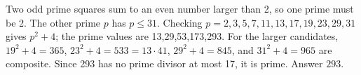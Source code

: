 Two odd prime squares sum to an even number larger than 2, so one prime must be 2. The other prime $p$ has $p\le31$. Checking $p=2,3,5,7,11,13,17,19,23,29,31$ gives $p^2+4$; the prime values are 13,29,53,173,293. For the larger candidates, $19^2+4=365$, $23^2+4=533=13\cdot41$, $29^2+4=845$, and $31^2+4=965$ are composite. Since 293 has no prime divisor at most 17, it is prime. Answer $\boxed{293}$.
